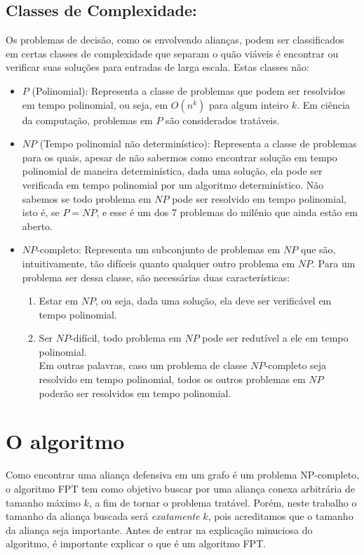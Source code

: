 \subsection{Classes de Complexidade:}
Os problemas de decisão, como os envolvendo alianças, podem ser classificados em certas classes de complexidade que separam o quão viáveis é encontrar ou verificar suas soluções para entradas de larga escala. Estas classes não:

\begin{itemize}
  \item $P$ (Polinomial): Representa a classe de problemas que podem ser resolvidos em tempo polinomial, ou seja, em $O(n^k)$ para algum inteiro $k$. Em ciência da computação, problemas em $P$ são considerados tratáveis.
  \item $NP$ (Tempo polinomial não determinístico): Representa a classe de problemas para os quais, apesar de não sabermos como encontrar solução em tempo polinomial de maneira determinística, dada uma solução, ela pode ser verificada em tempo polinomial por um algoritmo determinístico. Não sabemos se todo problema em $NP$ pode ser resolvido em tempo polinomial, isto é, se $P = NP$, e esse é um dos 7 problemas do milênio que ainda estão em aberto.
  \item $NP$-completo: Representa um subconjunto de problemas em $NP$ que são, intuitivamente, tão difíceis quanto qualquer outro problema em $NP$. Para um problema ser dessa classe, são necessárias duas características:
  \begin{enumerate}
    \item Estar em $NP$, ou seja, dada uma solução, ela deve ser verificável em tempo polinomial.
    \item Ser $NP$-difícil, todo problema em $NP$ pode ser redutível a ele em tempo polinomial.\\
Em outras palavras, caso um problema de classe $NP$-completo seja resolvido em tempo polinomial, todos os outros problemas em $NP$ poderão ser resolvidos em tempo polinomial.
  \end{enumerate}
\end{itemize}

\section{O algoritmo}
Como encontrar uma aliança defensiva em um grafo é um problema NP-completo, o algoritmo FPT \cite{Enciso2009} tem como objetivo buscar por uma aliança conexa arbitrária de tamanho máximo $k$, a fim de tornar o problema tratável. Porém, neste trabalho o tamanho da aliança buscada será \textit{exatamente} $k$, pois acreditamos que o tamanho da aliança seja importante. Antes de entrar na explicação minuciosa do algoritmo, é importante explicar o que é um algoritmo FPT.

